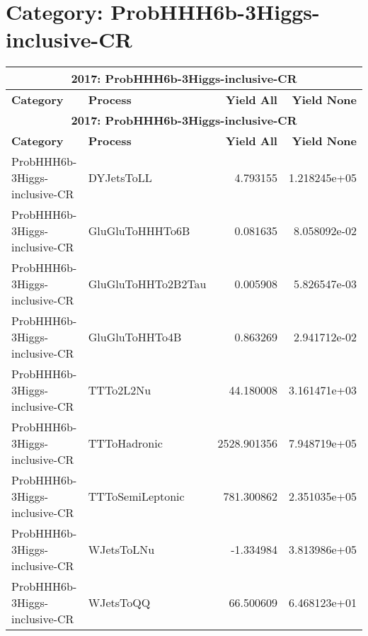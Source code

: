 \documentclass{article}
\begin{document}
\section*{Category: ProbHHH6b-3Higgs-inclusive-CR}
\begin{longtable}[c]{|l|l|r|r|}
\hline
\multicolumn{4}{|c|}{\textbf{2017: ProbHHH6b-3Higgs-inclusive-CR}} \\
\hline
\textbf{Category} & \textbf{Process} & \textbf{Yield All} & \textbf{Yield None} \\
\hline
\endfirsthead
\hline
\multicolumn{4}{|c|}{\textbf{2017: ProbHHH6b-3Higgs-inclusive-CR}} \\
\hline
\textbf{Category} & \textbf{Process} & \textbf{Yield All} & \textbf{Yield None} \\
\hline
\endhead
ProbHHH6b-3Higgs-inclusive-CR & DYJetsToLL & 4.793155 & 1.218245e+05 \\
\hline
ProbHHH6b-3Higgs-inclusive-CR & GluGluToHHHTo6B & 0.081635 & 8.058092e-02 \\
\hline
ProbHHH6b-3Higgs-inclusive-CR & GluGluToHHTo2B2Tau & 0.005908 & 5.826547e-03 \\
\hline
ProbHHH6b-3Higgs-inclusive-CR & GluGluToHHTo4B & 0.863269 & 2.941712e-02 \\
\hline
ProbHHH6b-3Higgs-inclusive-CR & TTTo2L2Nu & 44.180008 & 3.161471e+03 \\
\hline
ProbHHH6b-3Higgs-inclusive-CR & TTToHadronic & 2528.901356 & 7.948719e+05 \\
\hline
ProbHHH6b-3Higgs-inclusive-CR & TTToSemiLeptonic & 781.300862 & 2.351035e+05 \\
\hline
ProbHHH6b-3Higgs-inclusive-CR & WJetsToLNu & -1.334984 & 3.813986e+05 \\
\hline
ProbHHH6b-3Higgs-inclusive-CR & WJetsToQQ & 66.500609 & 6.468123e+01 \\
\hline
\end{longtable}
\end{document}
